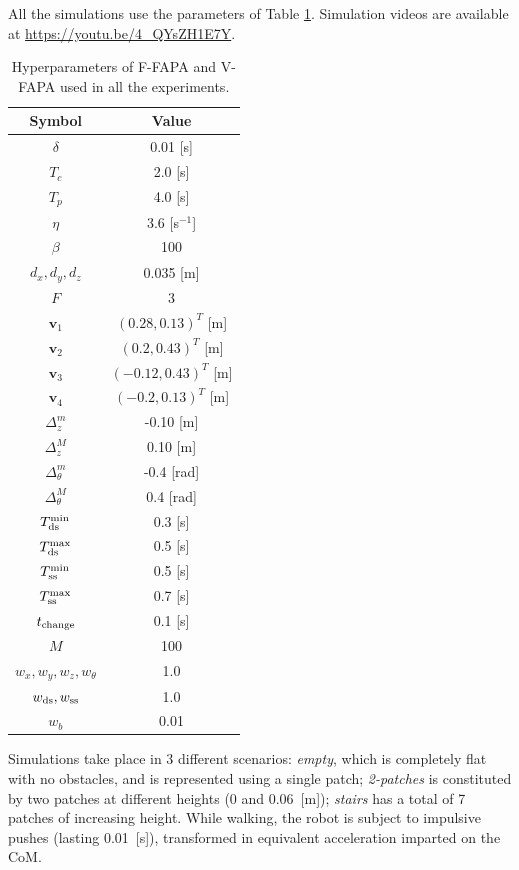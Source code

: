 All the simulations use the parameters of Table \ref{tab:FAPA:hyperparameters}.
Simulation videos are available at \url{https://youtu.be/4_QYsZH1E7Y}.

\begin{table}
    \centering
    \begin{tabular}{ |c|c| } 
        \hline
        Symbol & Value \\
        \hline
        $\delta$ & 0.01 [s] \\
        $T_c$ & 2.0 [s] \\
        $T_p$ & 4.0 [s] \\
        $\eta$ & 3.6 [s$^{-1}$] \\
        $\beta$ & 100 \\
        $d_x, d_y, d_z$ & 0.035 [m] \\
        $F$ & 3 \\
        $\bm{v}_1$ & $(0.28, 0.13)^T $ [m] \\
        $\bm{v}_2$ & $(0.2, 0.43)^T$ [m] \\
        $\bm{v}_3$ & $(-0.12, 0.43)^T$ [m] \\
        $\bm{v}_4$ & $(-0.2, 0.13)^T$ [m] \\
        $\Delta_z^m$ & -0.10 [m] \\
        $\Delta_z^M$ & 0.10 [m] \\
        $\Delta_{\theta}^m$ & -0.4 [rad] \\
        $\Delta_{\theta}^M$ & 0.4 [rad] \\
        $T_{\rm ds}^{\min}$ & 0.3 [s] \\
        $T_{\rm ds}^{\max}$ & 0.5 [s] \\
        $T_{\rm ss}^{\min}$ & 0.5 [s] \\
        $T_{\rm ss}^{\max}$ & 0.7 [s] \\
        $t_{\rm change}$ & 0.1 [s] \\
        $M$ & 100 \\
        $w_x, w_y, w_z, w_{\theta}$ & 1.0 \\
        $w_{\rm ds}, w_{\rm ss}$ & 1.0 \\
        $w_b$ & 0.01 \\
        \hline
    \end{tabular}
    \caption{Hyperparameters of F-FAPA and V-FAPA used in all the experiments.}
    \label{tab:FAPA:hyperparameters}
\end{table}

Simulations take place in 3 different scenarios: {\em empty}, which is
completely flat with no obstacles, and is represented using a single patch;
{\em 2-patches} is constituted by two patches at different heights
(0 and 0.06~[m]); {\em stairs} has a total of 7 patches of increasing height.
While walking, the robot is subject to impulsive pushes (lasting 0.01~[s]),
transformed in equivalent acceleration imparted on the CoM.

